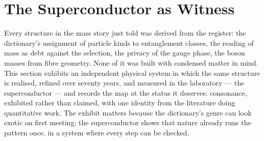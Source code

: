 %
%      
%      
%
%

\section{The Superconductor as Witness}
\label{sec:superconductor-witness}

Every structure in the mass story just told was derived from the register: the dictionary's
assignment of particle kinds to entanglement classes, the reading of mass as debt against the
selection, the privacy of the gauge phase, the boson masses from fibre geometry. None of it was
built with condensed matter in mind. This section exhibits an independent physical system in which
the same structure is realised, refined over seventy years, and measured in the laboratory --- the
superconductor --- and records the map at the status it deserves: consonance, exhibited rather
than claimed, with one identity from the literature doing quantitative work. The exhibit matters
because the dictionary's genre can look exotic on first meeting; the superconductor shows that
nature already runs the pattern once, in a system where every step can be checked.

